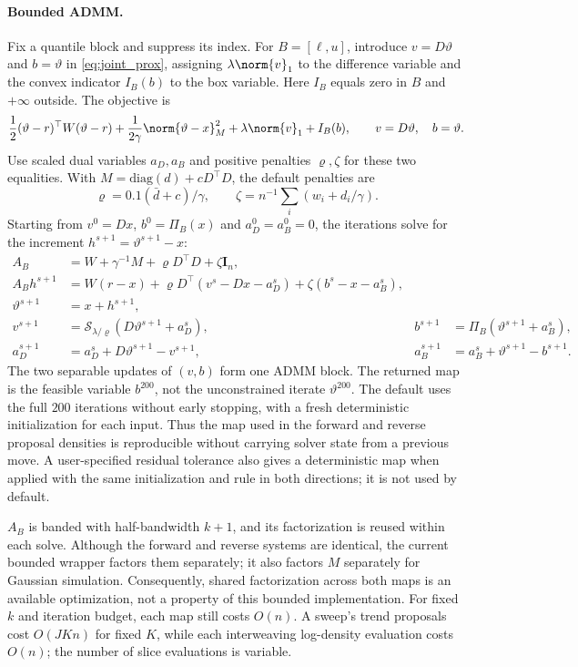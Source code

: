 \paragraph{Bounded ADMM.} Fix a quantile block and suppress its index. For $B=[\ell,u]$, introduce $v=D\vartheta$ and $b=\vartheta$ in \eqref{eq:joint_prox}, assigning $\lambda\norm{v}_1$ to the difference variable and the convex indicator $I_B(b)$ to the box variable. Here $I_B$ equals zero in $B$ and $+\infty$ outside. The objective is
\[
    \frac12(\vartheta-r)^\top W(\vartheta-r)
    +\frac{1}{2\gamma}\norm{\vartheta-x}_M^2
    +\lambda\norm{v}_1+I_B(b),
    \qquad v=D\vartheta,\quad b=\vartheta.
\]
Use scaled dual variables $a_D,a_B$ and positive penalties $\varrho,\zeta$ for these two equalities. With $M=\mathrm{diag}(d)+cD^\top D$, the default penalties are
\[
    \varrho=0.1(\bar d+c)/\gamma,\qquad
    \zeta=n^{-1}\sum_i(w_i+d_i/\gamma).
\]
Starting from $v^0=Dx$, $b^0=\Pi_B(x)$ and $a_D^0=a_B^0=0$, the iterations solve for the increment $h^{s+1}=\vartheta^{s+1}-x$:
\begin{align*}
    A_B &= W+\gamma^{-1}M+\varrho D^\top D+\zeta\mathbf I_n,\\
    A_Bh^{s+1} &= W(r-x)+\varrho D^\top(v^s-Dx-a_D^s)
                         +\zeta(b^s-x-a_B^s),\\
    \vartheta^{s+1} &= x+h^{s+1},\\
    v^{s+1} &= \mathcal S_{\lambda/\varrho}(D\vartheta^{s+1}+a_D^s),
    & b^{s+1} &= \Pi_B(\vartheta^{s+1}+a_B^s),\\
    a_D^{s+1} &= a_D^s+D\vartheta^{s+1}-v^{s+1},
    & a_B^{s+1} &= a_B^s+\vartheta^{s+1}-b^{s+1}.
\end{align*}
The two separable updates of $(v,b)$ form one ADMM block. The returned map is the feasible variable $b^{200}$, not the unconstrained iterate $\vartheta^{200}$. The default uses the full $200$ iterations without early stopping, with a fresh deterministic initialization for each input. Thus the map used in the forward and reverse proposal densities is reproducible without carrying solver state from a previous move. A user-specified residual tolerance also gives a deterministic map when applied with the same initialization and rule in both directions; it is not used by default.

$A_B$ is banded with half-bandwidth $k+1$, and its factorization is reused within each solve. Although the forward and reverse systems are identical, the current bounded wrapper factors them separately; it also factors $M$ separately for Gaussian simulation. Consequently, shared factorization across both maps is an available optimization, not a property of this bounded implementation. For fixed $k$ and iteration budget, each map still costs $O(n)$. A sweep's trend proposals cost $O(JKn)$ for fixed $K$, while each interweaving log-density evaluation costs $O(n)$; the number of slice evaluations is variable.


